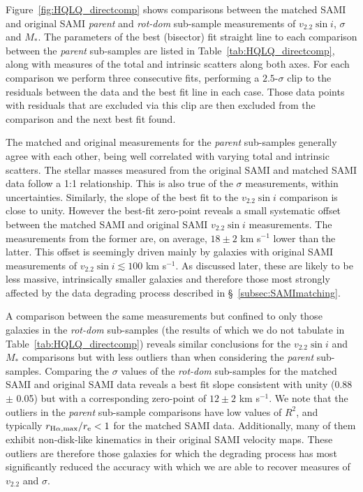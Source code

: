 \documentclass[a4paper,fleqn,usenatbib]{mnras}
\begin{document}
{Figure~\ref{fig:HQLQ_directcomp} shows comparisons between the matched SAMI and original SAMI \textit{parent} and \textit{rot-dom} sub-sample measurements of $v_{2.2}\sin i$, $\sigma$ and $M_{*}$. The parameters of the best (bisector) fit straight line to each comparison between the \textit{parent} sub-samples are listed in Table~\ref{tab:HQLQ_directcomp}, along with measures of the total and intrinsic scatters along both axes. For each comparison we perform three consecutive fits, performing a $2.5$-$\sigma$ clip to the residuals between the data and the best fit line in each case. Those data points with residuals that are excluded via this clip are then excluded from the comparison and the next best fit found. 

The matched and original measurements for the \textit{parent} sub-samples generally agree with each other, being well correlated with varying total and intrinsic scatters. The stellar masses measured from the original SAMI and matched SAMI data follow a 1:1 relationship. This is also true of the $\sigma$ measurements, within uncertainties.  Similarly, the slope of the best fit to the $v_{2.2}\sin i$ comparison is close to unity. However the best-fit zero-point reveals a small systematic offset between the matched SAMI and original SAMI $v_{2.2}\sin i$ measurements. The measurements from the former are, on average, $18 \pm 2$ km s$^{-1}$ lower than the latter. This offset is seemingly driven mainly by galaxies with original SAMI measurements of $v_{2.2}\sin i \lesssim 100$ km s$^{-1}$. As discussed later, these are likely to be less massive, intrinsically smaller galaxies and therefore those most strongly affected by the data degrading process described in \S~\ref{subsec:SAMImatching}. 

A comparison between the same measurements but confined to only those galaxies in the \textit{rot-dom} sub-samples (the results of which we do not tabulate in Table~\ref{tab:HQLQ_directcomp}) reveals similar conclusions for the $v_{2.2}\sin i$ and $M_{*}$ comparisons but with less outliers than when considering the \textit{parent} sub-samples. Comparing the $\sigma$ values of the \textit{rot-dom} sub-samples for the matched SAMI and original SAMI data reveals a best fit slope consistent with unity ($0.88$ $\pm$ 0.05) but with a corresponding zero-point of $12 \pm 2$ km s$^{-1}$. We note that the outliers in the \textit{parent} sub-sample comparisons have low values of $R^{2}$, and typically $r_{\rm{H}\alpha,\rm{max}}/r_{\rm{e}} < 1$ for the matched SAMI data. Additionally, many of them exhibit non-disk-like kinematics in their original SAMI velocity maps. These outliers are therefore those galaxies for which the degrading process has most significantly reduced the accuracy with which we are able to recover measures of $v_{2.2}$ and $\sigma$.

}
\end{document}
